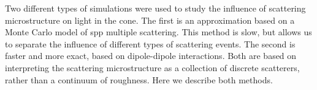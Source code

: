 Two different types of simulations were used to study the influence of
scattering microstructure on light in the cone.  The first is an
approximation based on a Monte Carlo model of \gls{spp} multiple scattering.
This method is slow, but allows us to separate the influence of different
types of scattering events.  The second is faster and more exact, based on
dipole-dipole interactions.  Both are based on interpreting the scattering
microstructure as a collection of discrete scatterers, rather than a
continuum of roughness.  Here we describe both methods.
